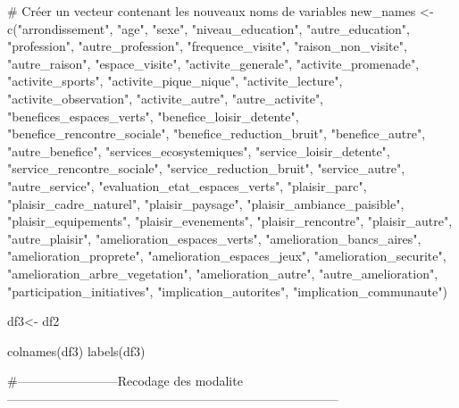 # Créer un vecteur contenant les nouveaux noms de variables
new_names <- c("arrondissement", "age", "sexe", "niveau_education", "autre_education",
               "profession", "autre_profession", "frequence_visite", "raison_non_visite",
               "autre_raison", "espace_visite", "activite_generale", "activite_promenade",
               "activite_sports", "activite_pique_nique", "activite_lecture",
               "activite_observation", "activite_autre", "autre_activite",
               "benefices_espaces_verts", "benefice_loisir_detente", "benefice_rencontre_sociale",
               "benefice_reduction_bruit", "benefice_autre", "autre_benefice",
               "services_ecosystemiques", "service_loisir_detente", "service_rencontre_sociale",
               "service_reduction_bruit", "service_autre", "autre_service",
               "evaluation_etat_espaces_verts", "plaisir_parc", "plaisir_cadre_naturel",
               "plaisir_paysage", "plaisir_ambiance_paisible", "plaisir_equipements",
               "plaisir_evenements", "plaisir_rencontre", "plaisir_autre", "autre_plaisir",
               "amelioration_espaces_verts", "amelioration_bancs_aires", "amelioration_proprete",
               "amelioration_espaces_jeux", "amelioration_securite", "amelioration_arbre_vegetation",
               "amelioration_autre", "autre_amelioration", "participation_initiatives",
               "implication_autorites", "implication_communaute")

df3<- df2%

colnames(df3)
labels(df3)





#------------------------Recodage des modalite--------------------------------------------------------------------------------

